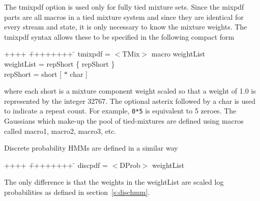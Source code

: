 The {\sf tmixpdf} option is used only for fully 
tied mixture sets.  Since the {\sf mixpdf} parts are all macros in
a tied mixture system and since they are identical for every stream
and state, it is only necessary to know the mixture weights.  The
{\sf tmixpdf} syntax allows these to be specified in the following
compact form
{\sf
\begin{tabbing}
++++ \= ++++++++ \=  \kill
\>   tmixpdf = \> $<$TMix$>$ macro weightList \\
\>   weightList = \> repShort \{ repShort \} \\
\>   repShort = \> short [ $\ast$ char ]
\end{tabbing}
}
\noindent
where each {\sf short} is a mixture component weight scaled so that
a weight of 1.0 is represented by the integer 32767.  
The optional asterix 
followed by a {\sf char} is used to indicate
a repeat count.  For example, {\tt 0*5} is equivalent to 5 zeroes.
The Gaussians which make-up the pool of tied-mixtures are defined 
using   macros called
{\sf macro1}, {\sf macro2}, {\sf macro3}, etc. 

Discrete probability HMMs are defined in a similar way
{\sf
\begin{tabbing}
++++ \= ++++++++ \=  \kill
\>   discpdf = \> $<$DProb$>$ weightList
\end{tabbing}
}
\noindent
The only difference is that the weights in the \textsf{weightList}
are scaled log probabilities as defined in section~\ref{s:dischmm}.

